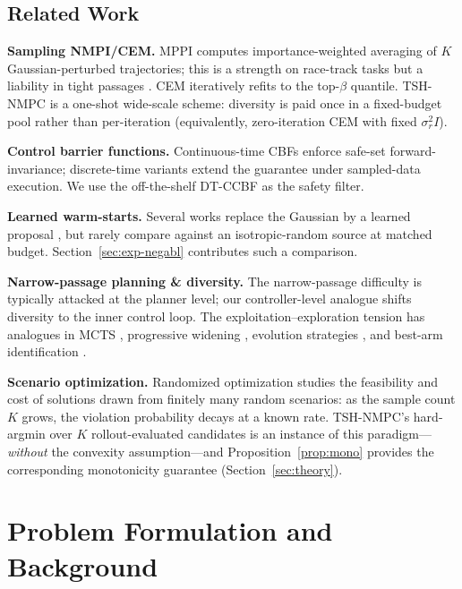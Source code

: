 \documentclass[11pt,onecolumn,a4paper]{article}
\begin{document}
\subsection{Related Work}

\textbf{Sampling NMPI/CEM.} MPPI \cite{WIL17,WIL18} computes
importance-weighted averaging of $K$ Gaussian-perturbed trajectories;
this is a strength on race-track tasks but a liability in tight
passages \cite{SUN22,GAN21}. CEM \cite{BOT13,RUB04} iteratively
refits to the top-$\beta$ quantile. TSH-NMPC is a one-shot
wide-scale scheme: diversity is paid once in a fixed-budget pool
rather than per-iteration (equivalently, zero-iteration CEM with
fixed $\sigma_r^2 I$).

\textbf{Control barrier functions.} Continuous-time CBFs
\cite{AME17} enforce safe-set forward-invariance; discrete-time
variants \cite{WAN17} extend the guarantee under sampled-data
execution. We use the off-the-shelf DT-CCBF as the safety filter.

\textbf{Learned warm-starts.} Several works replace the Gaussian
by a learned proposal \cite{PAN17,KAH18,OKA20,JAN22}, but rarely
compare against an isotropic-random source at matched budget.
Section~\ref{sec:exp-negabl} contributes such a comparison.

\textbf{Narrow-passage planning \& diversity.} The narrow-passage
difficulty \cite{HSU03,SUN05} is typically attacked at the planner
level; our controller-level analogue shifts diversity to the inner
control loop. The exploitation--exploration tension has analogues in
MCTS \cite{KOC06}, progressive widening \cite{COU11}, evolution
strategies \cite{HAN01,SAL17}, and best-arm identification
\cite{AUD10}.

\textbf{Scenario optimization.} Randomized optimization
\cite{CAM08,CAM18} studies the feasibility and cost of solutions
drawn from finitely many random scenarios: as the sample count $K$
grows, the violation probability decays at a known rate. TSH-NMPC's
hard-argmin over $K$ rollout-evaluated candidates is an instance of
this paradigm---\emph{without} the convexity assumption---and
Proposition~\ref{prop:mono} provides the corresponding monotonicity
guarantee (Section~\ref{sec:theory}).

\section{Problem Formulation and Background}\label{sec:problem}
\end{document}
